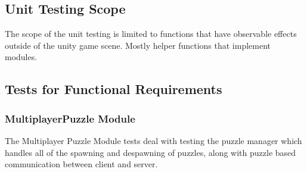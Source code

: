 \documentclass[12pt, titlepage]{article}
\begin{document}
\subsection{Unit Testing Scope}

The scope of the unit testing is limited to functions that have observable effects outside of the unity game scene. Mostly helper functions that implement modules.

\subsection{Tests for Functional Requirements}

\subsubsection{MultiplayerPuzzle Module}
The Multiplayer Puzzle Module tests deal with testing the puzzle manager which handles all of the spawning and despawning of puzzles, along with puzzle based communication between client and server. 
\end{document}
